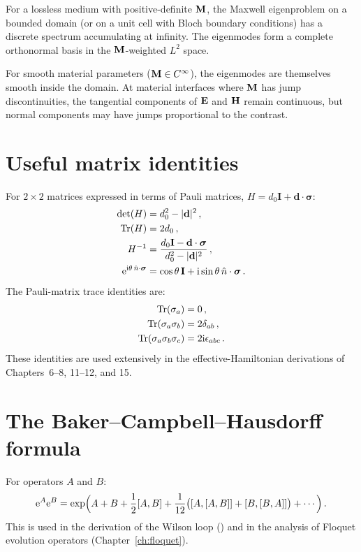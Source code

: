 For a lossless medium with positive-definite $\mathbf{M}$, the Maxwell
eigenproblem on a bounded domain (or on a unit cell with Bloch boundary
conditions) has a discrete spectrum accumulating at infinity.  The
eigenmodes form a complete orthonormal basis in the $\mathbf{M}$-weighted
$L^2$ space.

For smooth material parameters ($\mathbf{M}\in C^\infty$), the eigenmodes
are themselves smooth inside the domain.  At material interfaces where
$\mathbf{M}$ has jump discontinuities, the tangential components of
$\mathbf{E}$ and $\mathbf{H}$ remain continuous, but normal components may
have jumps proportional to the contrast.

\section{Useful matrix identities}
\label{sec:appA-matrix}

For $2\times 2$ matrices expressed in terms of Pauli matrices,
$H=d_0\mathbf{I}+\mathbf{d}\cdot\boldsymbol{\sigma}$:
\begin{align}
  \det(H) &= d_0^2 - |\mathbf{d}|^2\,,\\
  \operatorname{Tr}(H) &= 2d_0\,,\\
  H^{-1} &= \frac{d_0\mathbf{I}-\mathbf{d}\cdot\boldsymbol{\sigma}}
  {d_0^2-|\mathbf{d}|^2}\,,\\
  \mathrm{e}^{\mathrm{i}\theta\,\hat{n}\cdot\boldsymbol{\sigma}}
  &= \cos\theta\,\mathbf{I}+\mathrm{i}\sin\theta\,
  \hat{n}\cdot\boldsymbol{\sigma}\,.
\end{align}
The Pauli-matrix trace identities are:
\begin{align}
  \operatorname{Tr}(\sigma_a) &= 0\,,\\
  \operatorname{Tr}(\sigma_a\sigma_b) &= 2\delta_{ab}\,,\\
  \operatorname{Tr}(\sigma_a\sigma_b\sigma_c) &= 2\mathrm{i}\epsilon_{abc}\,.
\end{align}
These identities are used extensively in the effective-Hamiltonian
derivations of Chapters~6--8, 11--12, and 15.

\section{The Baker--Campbell--Hausdorff formula}
\label{sec:appA-bch}

For operators $A$ and $B$:
\begin{equation}\label{eq:appA-bch}
  \mathrm{e}^A\mathrm{e}^B = \exp\Bigl(A+B+\frac{1}{2}[A,B]
  +\frac{1}{12}\bigl([A,[A,B]]+[B,[B,A]]\bigr)+\cdots\Bigr)\,.
\end{equation}
This is used in the derivation of the Wilson loop
() and in the analysis of Floquet evolution
operators (Chapter~\ref{ch:floquet}).

